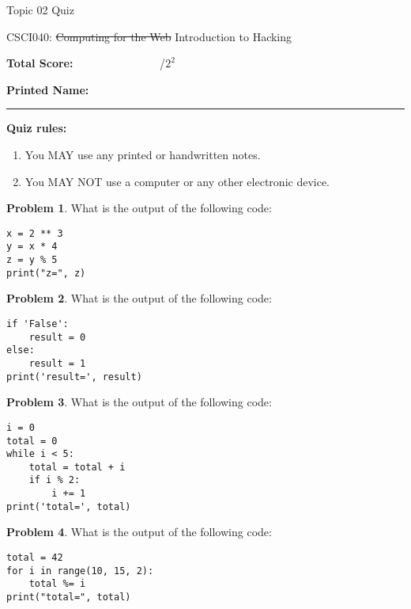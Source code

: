 \documentclass[10pt]{article}
\theoremstyle{definition}
\newtheorem{problem}{Problem}
\begin{document}
\begin{center}
    {
\Large
    Topic 02 Quiz
}

    \vspace{0.1in}
    CSCI040: \sout{Computing for the Web} Introduction to Hacking

    \vspace{0.1in}
\end{center}

\vspace{0.15in}
\noindent
\textbf{Total Score:} ~~~~~~~~~~~~~~~/$2^2$

\vspace{0.5in}
\noindent
\textbf{Printed Name:}

\noindent
\rule{\textwidth}{0.1pt}
\vspace{0.25in}

\noindent
\textbf{Quiz rules:}
\begin{enumerate}
    \item You MAY use any printed or handwritten notes.
    \item You MAY NOT use a computer or any other electronic device.
\end{enumerate}

\noindent

\vspace{0.15in}

\begin{problem}
    What is the output of the following code:
\end{problem}
\begin{lstlisting}
x = 2 ** 3
y = x * 4
z = y % 5
print("z=", z)
\end{lstlisting}
\vspace{0.1in}

\begin{problem}
    What is the output of the following code:
\end{problem}
\begin{lstlisting}
if 'False':
    result = 0
else:
    result = 1
print('result=', result)
\end{lstlisting}
\vspace{0.1in}

\begin{problem}
    What is the output of the following code:
\end{problem}
\begin{lstlisting}
i = 0
total = 0
while i < 5:
    total = total + i
    if i % 2:
        i += 1
print('total=', total)
\end{lstlisting}
\vspace{0.1in}

\begin{problem}
    What is the output of the following code:
\end{problem}
\begin{lstlisting}
total = 42
for i in range(10, 15, 2):
    total %= i
print("total=", total)
\end{lstlisting}
\vspace{0.1in}
\end{document}
